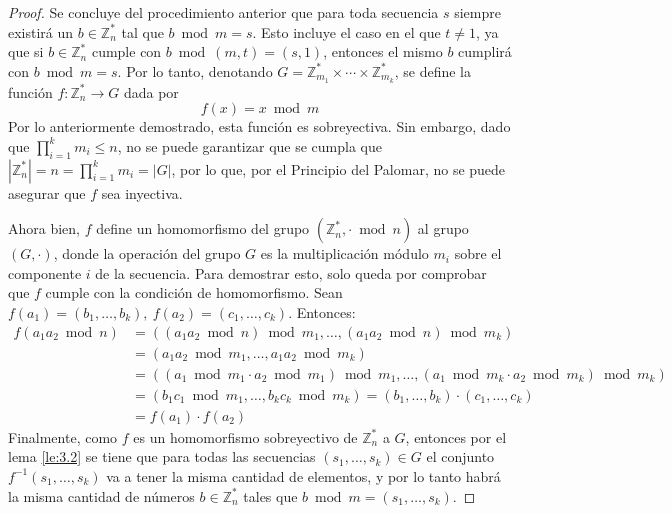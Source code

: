 \documentclass[hidelinks, 12pt]{article}
\newcommand{\Zs}{\mathbb{Z}^*}
\newcommand{\ra}{\rightarrow}
\begin{document}
\begin{proof}
    Se concluye del procedimiento anterior que para toda secuencia $s$ siempre existirá un $b\in\Zs_n$ tal que $b\bmod m=s$. Esto incluye el caso en el que $t\neq 1$, ya que si $b\in\Zs_n$ cumple con $b\bmod(m,t)=(s,1)$, entonces el mismo $b$ cumplirá con $b\bmod m=s$. Por lo tanto, denotando $G=\Zs_{m_1}\times\dotsm\times\Zs_{m_k}$, se define la función $f:\Zs_n\ra G$ dada por
    \[f(x)=x\bmod m\]
    Por lo anteriormente demostrado, esta función es sobreyectiva. Sin embargo, dado que $\prod^k_{i=1}m_i\leq n$, no se puede garantizar que se cumpla que $|\Zs_n|=n=\prod^k_{i=1}m_i=|G|$, por lo que, por el Principio del Palomar, no se puede asegurar que $f$ sea inyectiva.

    Ahora bien, $f$ define un homomorfismo del grupo $(\Zs_n,\cdot\bmod n)$ al grupo $(G,\cdot)$, donde la operación del grupo $G$ es la multiplicación módulo $m_i$ sobre el componente $i$ de la secuencia. Para demostrar esto, solo queda por comprobar que $f$ cumple con la condición de homomorfismo. Sean $f(a_1)=(b_1,\dots,b_k),~f(a_2)=(c_1,\dots,c_k)$. Entonces:
    \begin{align*}
        f(a_1a_2\bmod n)&=((a_1a_2\bmod n)\bmod m_1,\dots,(a_1a_2\bmod n)\bmod m_k) \\
        &=(a_1a_2\bmod m_1,\dots,a_1a_2\bmod m_k) \\
        &=((a_1\bmod m_1\cdot a_2\bmod m_1)\bmod m_1,\dots,(a_1\bmod m_k\cdot a_2\bmod m_k)\bmod m_k) \\
        &=(b_1c_1\bmod m_1,\dots,b_kc_k\bmod m_k)=(b_1,\dots,b_k)\cdot(c_1,\dots,c_k) \\
        &=f(a_1)\cdot f(a_2)
    \end{align*}
    Finalmente, como $f$ es un homomorfismo sobreyectivo de $\Zs_n$ a $G$, entonces por el lema \ref{le:3.2} se tiene que para todas las secuencias $(s_1,\dots,s_k)\in G$ el conjunto $f^{-1}(s_1,\dots,s_k)$ va a tener la misma cantidad de elementos, y por lo tanto habrá la misma cantidad de números $b\in\Zs_n$ tales que $b\bmod m=(s_1,\dots,s_k)$.
\end{proof}
\end{document}
